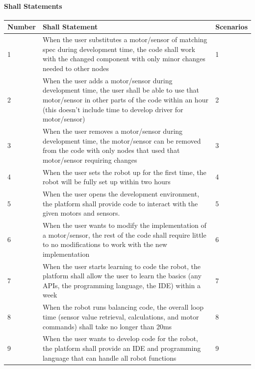 \documentclass{fank1basedocument}
\begin{document}
\pagebreak

\paragraph{Shall Statements}
\begin{center}
	\begin{tabular}{|p{}|p{}|p{}|}
		\hline
		\textbf{Number} & \textbf{Shall Statement} & \textbf{Scenarios}\\
		\hline
		1 & When the user substitutes a motor/sensor of matching spec during development time, the code shall work with the changed component with only minor changes needed to other nodes & 1\\
		\hline
		2 & When the user adds a motor/sensor during development time, the user shall be able to use that motor/sensor in other parts of the code within an hour (this doesn’t include time to develop driver for motor/sensor) & 2\\
		\hline
		3 & When the user removes a motor/sensor during development time, the motor/sensor can be removed from the code with only nodes that used that motor/sensor requiring changes & 3\\
		\hline
		4 & When the user sets the robot up for the first time, the robot will be fully set up within two hours & 4\\
		\hline
		5 & When the user opens the development environment, the platform shall provide code to interact with the given motors and sensors. & 5\\
		\hline
		6 & When the user wants to modify the implementation of a motor/sensor, the rest of the code shall require little to no modifications to work with the new implementation & 6\\
		\hline
		7 & When the user starts learning to code the robot, the platform shall allow the user to learn the basics (any APIs, the programming language, the IDE) within a week & 7\\
		\hline
		8 & When the robot runs balancing code, the overall loop time (sensor value retrieval, calculations, and motor commands) shall take no longer than 20ms & 8\\
		\hline
		9 & When the user wants to develop code for the robot, the platform shall provide an IDE and programming language that can handle all robot functions & 9\\
		\hline
	\end{tabular}
\end{center}
\end{document}
